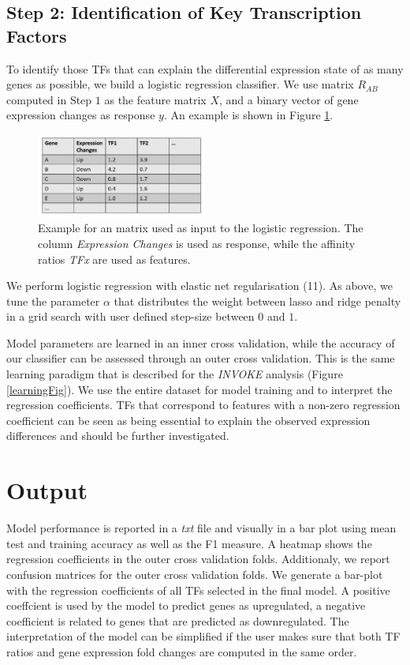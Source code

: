 \documentclass{article}
\begin{document}
\subsection*{Step 2: Identification of Key Transcription Factors}
To identify those TFs that can explain the differential expression state of as many genes as possible, we build a logistic regression classifier. 
We use matrix $R_{AB}$ computed in Step $1$ as the feature matrix $X$, and a binary vector of gene expression changes as response $y$. 
An example is shown in Figure \ref{Log-Reg-Example}.
\begin{figure}[h!]
\centering
\includegraphics[width=0.5\textwidth]{Example_Matrix.png}
\caption{Example for an matrix used as input to the logistic regression. The column \textit{Expression Changes} is used as response, while the affinity ratios \textit{TFx} are used as features.}
\label{Log-Reg-Example}
\end{figure}
We perform logistic regression with elastic net regularisation (11).
As above, we tune the parameter $\alpha$ that distributes the weight between lasso and ridge penalty in a grid search with user defined step-size between $0$ and $1$.

Model parameters are learned in an inner cross validation, while the accuracy of our classifier can be assessed through an outer cross validation. This is the
same learning paradigm that is described for the \textit{INVOKE} analysis (Figure \ref{learningFig}). We use the entire dataset for model training and to interpret the regression coefficients.
TFs that correspond to features with a non-zero regression coefficient can be seen as being essential to explain the observed expression differences and should be further investigated.

\section*{Output}
Model performance is reported in a \textit{txt} file and visually in a bar plot using mean test and training accuracy as well as the F1 measure.
A heatmap shows the regression coefficients in the outer cross validation folds. 
Additionaly, we report confusion matrices for the outer cross validation folds.
We generate a bar-plot with the regression coefficients of all TFs selected in the final model.
A positive coeffcient is used by the model to predict genes as upregulated, a negative coefficient is related to genes that are predicted as downregulated. The interpretation
of the model can be simplified if the user makes sure that both TF ratios and gene expression fold changes are computed in the same order. 
\end{document}
